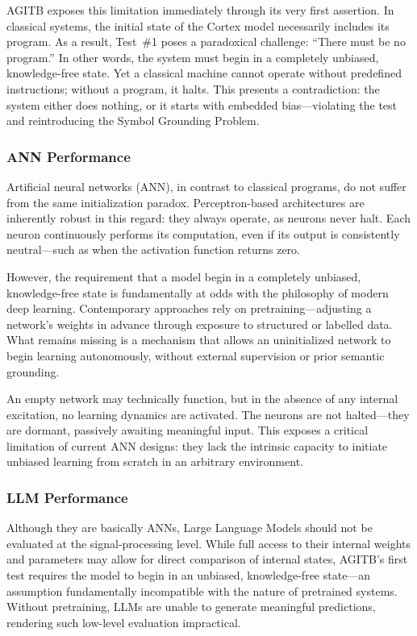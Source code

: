 \documentclass{article}
\begin{document}
AGITB exposes this limitation immediately through its very first assertion. In classical systems, the initial state of the Cortex model necessarily includes its program. As a result, Test~\#1 poses a paradoxical challenge: “There must be no program.” In other words, the system must begin in a completely unbiased, knowledge-free state. Yet a classical machine cannot operate without predefined instructions; without a program, it halts. This presents a contradiction: the system either does nothing, or it starts with embedded bias—violating the test and reintroducing the Symbol Grounding Problem.


\subsubsection{ANN Performance}

Artificial neural networks (ANN), in contrast to classical programs, do not suffer from the same initialization paradox. Perceptron-based architectures are inherently robust in this regard: they always operate, as neurons never halt. Each neuron continuously performs its computation, even if its output is consistently neutral—such as when the activation function returns zero.

However, the requirement that a model begin in a completely unbiased, knowledge-free state is fundamentally at odds with the philosophy of modern deep learning. Contemporary approaches rely on pretraining—adjusting a network’s weights in advance through exposure to structured or labelled data. What remains missing is a mechanism that allows an uninitialized network to begin learning autonomously, without external supervision or prior semantic grounding.

An empty network may technically function, but in the absence of any internal excitation, no learning dynamics are activated. The neurons are not halted—they are dormant, passively awaiting meaningful input. This exposes a critical limitation of current ANN designs: they lack the intrinsic capacity to initiate unbiased learning from scratch in an arbitrary environment.
 
\subsubsection{LLM Performance}

Although they are basically ANNs, Large Language Models should not be evaluated at the signal-processing level. While full access to their internal weights and parameters may allow for direct comparison of internal states, AGITB’s first test requires the model to begin in an unbiased, knowledge-free state—an assumption fundamentally incompatible with the nature of pretrained systems. Without pretraining, LLMs are unable to generate meaningful predictions, rendering such low-level evaluation impractical.
\end{document}
